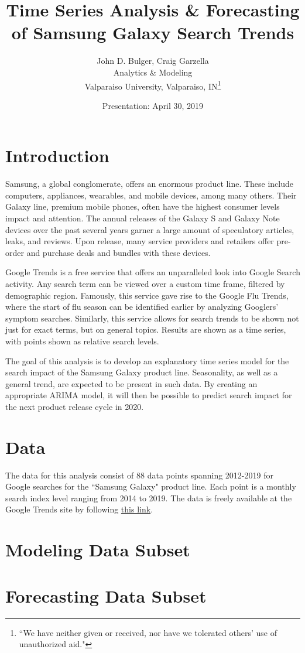 \documentclass[12pt]{article}
\title{Time Series Analysis \& Forecasting of Samsung Galaxy Search Trends}
\author{John D. Bulger, Craig Garzella\\
	Analytics \& Modeling
	\\Valparaiso University, Valparaiso, IN\thanks{``We have neither given or received, nor have we tolerated others' use of unauthorized aid."}}
\date{Presentation: April 30, 2019}
\begin{document}
	\maketitle
	
	\section{Introduction}
	
	Samsung, a global conglomerate, offers an enormous product line.  These include computers, appliances, wearables, and mobile devices, among many others.  Their Galaxy line, premium mobile phones, often have the highest consumer levels impact and attention.  The annual releases of the Galaxy S and Galaxy Note devices over the past several years garner a large amount of speculatory articles, leaks, and reviews.  Upon release, many service providers and retailers offer pre-order and purchase deals and bundles with these devices.
	
	\par
	
	
	Google Trends is a free service that offers an unparalleled look into Google Search activity.  Any search term can be viewed over a custom time frame, filtered by demographic region.  Famously, this service gave rise to the Google Flu Trends, where the start of flu season can be identified earlier by analyzing Googlers' symptom searches.  Similarly, this service allows for search trends to be shown not just for exact terms, but on general topics.  Results are shown as a time series, with points shown as relative search levels.
	
	\par
	
	The goal of this analysis is to develop an explanatory time series model for the search impact of the Samsung Galaxy product line.  Seasonality, as well as a general trend, are expected to be present in such data.  By creating an appropriate ARIMA model, it will then be possible to predict search impact for the next product release cycle in 2020.
	
	\section{Data}
	
	The data for this analysis consist of 88 data points spanning 2012-2019 for Google searches for the ``Samsung Galaxy" product line.  Each point is a monthly search index level ranging from 2014 to 2019.  The data is freely available at the Google Trends site by following \href{https://trends.google.com/trends/explore?q=\%2Fm\%2F0hnbsn3\&geo=US}{this link}.
	

\newpage
\begin{thebibliography}{3}
	
	
\end{thebibliography}

\newpage
\begin{appendices}	
	\section{Modeling Data Subset}
	
\newpage

	\section{Forecasting Data Subset}

\end{appendices}
\end{document}
